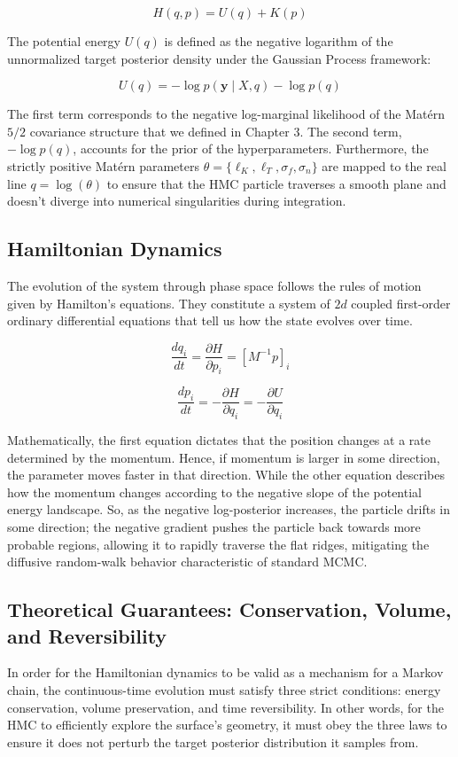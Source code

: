 \documentclass[12pt,oneside]{report}
\theoremstyle{definition}
\theoremstyle{remark}
\begin{document}
$$H(q, p) = U(q) + K(p)$$

The potential energy $U(q)$ is defined as the negative logarithm of the unnormalized target posterior density under the Gaussian Process framework:

$$U(q) = -\log p(\mathbf{y} \mid X, q) - \log p(q)$$

The first term corresponds to the negative log-marginal likelihood of the Matérn $5/2$ covariance structure that we defined in Chapter 3. The second term, $-\log p(q)$, accounts for the prior of the hyperparameters. Furthermore, the strictly positive Matérn parameters $\theta = \{\ell_K, \ell_T, \sigma_f, \sigma_n\}$ are mapped to the real line $q = \log(\theta)$ to ensure that the HMC particle traverses a smooth plane and doesn't diverge into numerical singularities during integration.

\subsection{Hamiltonian Dynamics}
The evolution of the system through phase space follows the rules of motion given by Hamilton's equations. They constitute a system of $2d$ coupled first-order ordinary differential equations that tell us how the state evolves over time.


$$\frac{dq_i}{dt} = \frac{\partial H}{\partial p_i} = [M^{-1} p]_i$$

$$\frac{dp_i}{dt} = -\frac{\partial H}{\partial q_i} = -\frac{\partial U}{\partial q_i}$$

Mathematically, the first equation dictates that the position changes at a rate determined by the momentum. Hence, if momentum is larger in some direction, the parameter moves faster in that direction. While the other equation describes how the momentum changes according to the negative slope of the potential energy landscape. So, as the negative log-posterior increases, the particle drifts in some direction; the negative gradient pushes the particle back towards more probable regions, allowing it to rapidly traverse the flat ridges, mitigating the diffusive random-walk behavior characteristic of standard MCMC.

\subsection{Theoretical Guarantees: Conservation, Volume, and Reversibility}

In order for the Hamiltonian dynamics to be valid as a mechanism for a Markov chain, the continuous-time evolution must satisfy three strict conditions: energy conservation, volume preservation, and time reversibility. In other words, for the HMC to efficiently explore the surface's geometry, it must obey the three laws to ensure it does not perturb the target posterior distribution it samples from.
\end{document}
